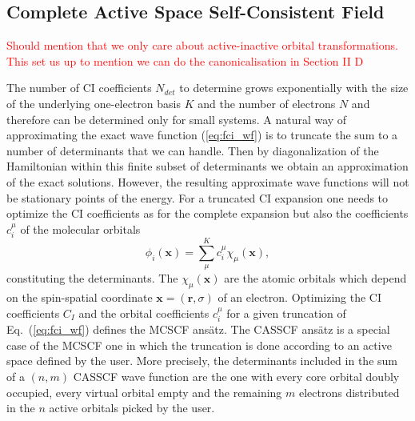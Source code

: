 \documentclass[aip,jcp,reprint,noshowkeys,superscriptaddress]{revtex4-1}
\newcommand{\todo}[1]{\textcolor{red}{#1}}
\begin{document}
\subsection{Complete Active Space Self-Consistent Field}
\label{subsec:CASSCF}

\todo{Should mention that we only care about active-inactive orbital transformations. This set us up to mention we can do the canonicalisation
in Section II D}

The number of CI coefficients $N_{det}$ to determine grows exponentially with the size of the underlying one-electron basis $K$ and the number of electrons $N$ and therefore can be determined only for small systems.
A natural way of approximating the exact wave function (\ref{eq:fci_wf}) is to truncate the sum to a number of determinants that we can handle. Then by diagonalization of the Hamiltonian within this finite subset of determinants we obtain an approximation of the exact solutions.
However, the resulting approximate wave functions will not be stationary points of the energy.
For a truncated CI expansion one needs to optimize the CI coefficients as for the complete expansion but also the coefficients $c_i^\mu$ of the molecular orbitals
\begin{equation}
  \label{eq:mo}
  \phi_i(\bm{x}) = \sum^K_\mu c_i^\mu \chi_{\mu}(\bm{x}),
\end{equation}
constituting the determinants. The $\chi_{\mu}(\bm{x})$ are the atomic orbitals which depend on the spin-spatial coordinate $\bm{x} = (\bm{r},\sigma)$ of an electron.
Optimizing the CI coefficients $C_I$ and the orbital coefficients $c_i^\mu$ for a given truncation of Eq.~(\ref{eq:fci_wf}) defines the MCSCF ans\"atz.
The CASSCF ans\"atz is a special case of the MCSCF one in which the truncation is done according to an active space defined by the user.
More precisely, the determinants included in the sum of a $(n,m)$ CASSCF wave function are the one with every core orbital doubly occupied, every virtual orbital empty and the remaining $m$ electrons distributed in the $n$ active orbitals picked by the user.
\end{document}
